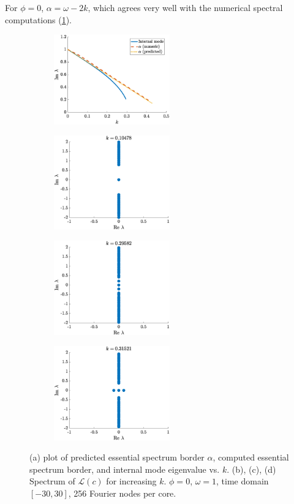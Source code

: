 \documentclass[11pt,reqno]{amsart}
\def\calL{{\mathcal L}}
\begin{document}
 For $\phi = 0$, $\alpha = \omega - 2k$, which agrees very well with the numerical spectral computations (\cref{fig:phi0speca}). 

\begin{figure}
    \centering
    \begin{subfigure}{0.4\linewidth}
        \caption{}
        \label{fig:phi0speca}
        \includegraphics[width=5cm]{phi0speck.eps}
    \end{subfigure}
    \begin{subfigure}{0.4\linewidth}
        \caption{}
        \label{fig:phi0specb}
        \includegraphics[width=5cm]{phi0spec1.eps}
    \end{subfigure}
        \begin{subfigure}{0.4\linewidth}
        \caption{}
        \label{fig:phi0specc}
        \includegraphics[width=5cm]{phi0spec2.eps}
    \end{subfigure}
    \begin{subfigure}{0.4\linewidth}
        \caption{}
        \label{fig:phi0specd}
        \includegraphics[width=5cm]{phi0spec3.eps}
    \end{subfigure}
    \caption{(a) plot of predicted essential spectrum border $\alpha$, computed essential spectrum border, and internal mode eigenvalue vs. $k$. (b), (c), (d) Spectrum of $\calL(c)$ for increasing $k$. $\phi =0$, $\omega=1$, time domain $[-30,30]$, 256 Fourier nodes per core.}
    \label{fig:phi0spec}
\end{figure}
\end{document}
